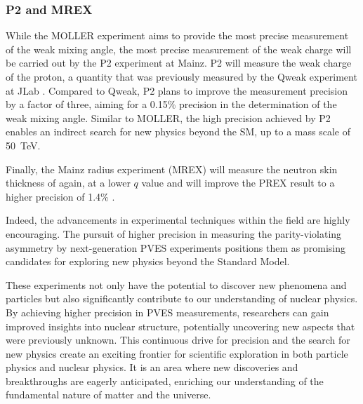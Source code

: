\subsubsection{P2 and MREX}
While the MOLLER experiment aims to provide the most precise measurement of the
weak mixing angle, the most precise measurement of the weak charge will be carried
out by the P2 experiment at Mainz.
P2 will measure the weak charge of the proton, a quantity that was previously
measured by the Qweak experiment at JLab \cite{PhysRevLett.111.141803}.
Compared to Qweak, P2 plans to improve the measurement precision by a factor of three,
aiming for a 0.15\% precision in the determination of the weak mixing angle.
Similar to MOLLER, the high precision achieved by P2 enables an indirect search 
for new physics beyond the SM, up to a mass scale of 50~TeV.

Finally, the Mainz radius experiment (MREX) will measure the neutron skin thickness of \Pb
again, at a lower $q$ value and will improve the PREX result to a higher precision
of 1.4\% \cite{Becker2018}.

\bigskip
Indeed, the advancements in experimental techniques within the field are highly encouraging. The pursuit of higher precision in measuring the parity-violating asymmetry by next-generation PVES experiments positions them as promising candidates for exploring new physics beyond the Standard Model.

These experiments not only have the potential to discover new phenomena and particles but also significantly contribute to our understanding of nuclear physics. By achieving higher precision in PVES measurements, researchers can gain improved insights into nuclear structure, potentially uncovering new aspects that were previously unknown. This continuous drive for precision and the search for new physics create an exciting frontier for scientific exploration in both particle physics and nuclear physics. It is an area where new discoveries and breakthroughs are eagerly anticipated, enriching our understanding of the fundamental nature of matter and the universe.
